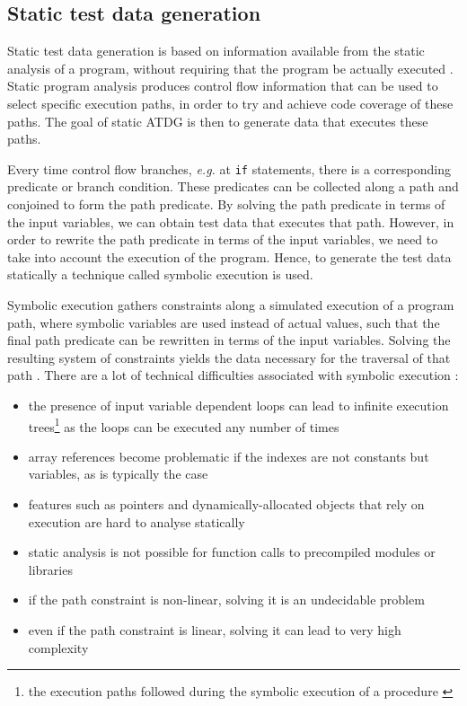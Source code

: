 \subsection{Static test data generation}
Static test data generation is based on information available from the static analysis of a program, without requiring that the program be actually executed \cite{mcminn2004search}. Static program analysis produces control flow information that can be used to select specific execution paths, in order to try and achieve code coverage of these paths. The goal of static ATDG is then to generate data that executes these paths.

Every time control flow branches, \emph{e.g.} at \texttt{if} statements, there is a corresponding predicate or branch condition. These predicates can be collected along a path and conjoined to form the path predicate. By solving the path predicate in terms of the input variables, we can obtain test data that executes that path. However, in order to rewrite the path predicate in terms of the input variables, we need to take into account the execution of the program. Hence, to generate the test data statically a technique called symbolic execution \cite{king1976symbolic} is used.

Symbolic execution gathers constraints along a simulated execution of a program path, where symbolic variables are used instead of actual values, such that the final path predicate can be rewritten in terms of the input variables. Solving the resulting system of constraints yields the data necessary for the traversal of that path \cite{king1975new, king1976symbolic}. There are a lot of technical difficulties associated with symbolic execution \cite{edvardsson1999survey,meudec2001atgen,mcminn2004search}:


\begin{itemize}
	\item the presence of input variable dependent loops can lead to infinite execution trees\footnote{the execution paths followed during the symbolic execution of a procedure \cite{king1976symbolic}} as the loops can be executed any number of times
	\item array references become problematic if the indexes are not constants but variables, as is typically the case
	\item features such as pointers and dynamically-allocated objects that rely on execution are hard to analyse statically
	\item static analysis is not possible for function calls to precompiled modules or libraries
	\item if the path constraint is non-linear, solving it is an undecidable problem
	\item even if the path constraint is linear, solving it can lead to very high complexity
\end{itemize}

